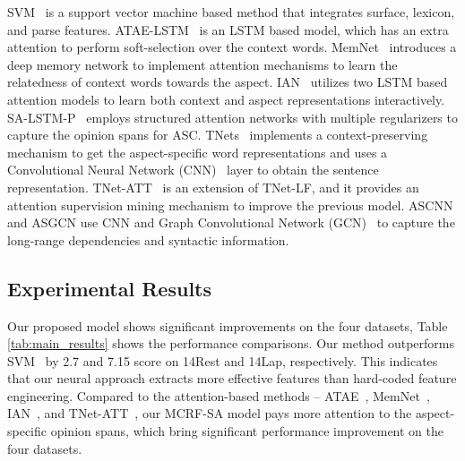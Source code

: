 \documentclass[11pt,a4paper]{article}
\begin{document}
SVM~\cite{kiritchenko-EtAl:2014:SemEval} is a support vector machine based method that integrates surface, lexicon, and parse features.
ATAE-LSTM~\cite{wang-etal-2016-attention} is an LSTM \cite{lstm} based model, which has an extra attention to perform soft-selection over the context words.
MemNet~\cite{Tang2016AspectLS} introduces a deep memory network to implement attention mechanisms to learn the relatedness of context words towards the aspect.
IAN~\cite{Ma2017InteractiveAN}  utilizes two LSTM based attention models to learn both context and aspect representations interactively.
SA-LSTM-P~\cite{bailin-lu:2018:AAAI2018} employs structured attention networks with multiple regularizers to capture the opinion spans for ASC. 
TNets~\cite{lixin2018P18-1087} implements a context-preserving mechanism to get the aspect-specific word representations and uses a Convolutional Neural Network (CNN)~\cite{cnn} layer to obtain the sentence representation.
TNet-ATT~\cite{Tang:ACL2019} is an extension of TNet-LF, and it provides an attention supervision mining mechanism to improve the previous model. 
ASCNN and ASGCN \cite{zhang-etal-2019-aspect} use CNN and Graph Convolutional Network (GCN)~\cite{kipf2017semi} to capture the long-range dependencies and syntactic information.
 



 
\subsection{Experimental Results}
Our proposed model shows significant improvements on the four datasets, Table \ref{tab:main_results} shows the performance comparisons. 
Our method outperforms SVM~\cite{kiritchenko-EtAl:2014:SemEval} by 2.7 and 7.15  score on 14Rest and 14Lap, respectively. 
This indicates that our neural approach extracts more effective features than hard-coded feature engineering. 
Compared to the attention-based methods -- ATAE~\cite{wang-etal-2016-attention}, MemNet~\cite{Tang2016AspectLS}, IAN~\cite{Ma2017InteractiveAN}, and TNet-ATT~\cite{Tang:ACL2019},  our MCRF-SA model pays more attention to the aspect-specific opinion spans, which bring significant performance improvement on the four datasets.
\end{document}
